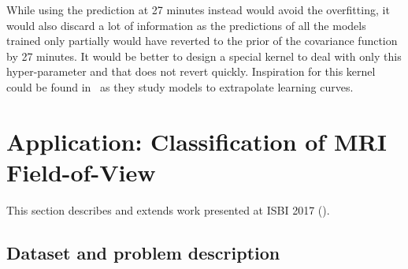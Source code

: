 While using the prediction at 27 minutes instead would avoid the overfitting, it would also discard a lot of information as the predictions of all the models trained only partially would have reverted to the prior of the covariance function by 27 minutes. It would be better to design a special kernel to deal with only this hyper-parameter and that does not revert quickly. Inspiration for this kernel could be found in~\textcite{domhan2015} as they study models to extrapolate learning curves.

\section{Application: Classification of MRI Field-of-View}
\label{sec:isbi}

This section describes and extends work presented at ISBI 2017 (\textcite{bertrand2017ISBI}).

\subsection{Dataset and problem description}


